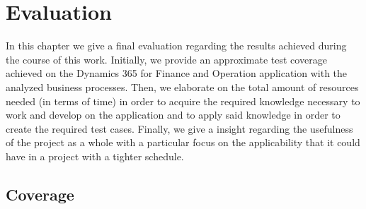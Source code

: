 \chapter{Evaluation}

In this chapter we give a final evaluation regarding the results achieved during the course of this work. Initially, we provide an approximate test coverage achieved on the Dynamics 365 for Finance and Operation application with the analyzed business processes. Then, we elaborate on the total amount of resources needed (in terms of time) in order to acquire the required knowledge necessary to work and develop on the application and to apply said knowledge in order to create the required test cases. Finally, we give a insight regarding the usefulness of the project as a whole with a particular focus on the applicability that it could have in a project with a tighter schedule.

\section{Coverage} 

